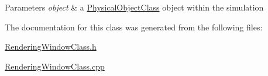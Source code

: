 \begin{DoxyParams}{Parameters}
{\em object} & a \hyperlink{classPhysicalObjectClass}{Physical\-Object\-Class} object within the simulation \\
\hline
\end{DoxyParams}


The documentation for this class was generated from the following files\-:\begin{DoxyCompactItemize}
\item 
\hyperlink{RenderingWindowClass_8h}{Rendering\-Window\-Class.\-h}\item 
\hyperlink{RenderingWindowClass_8cpp}{Rendering\-Window\-Class.\-cpp}\end{DoxyCompactItemize}
